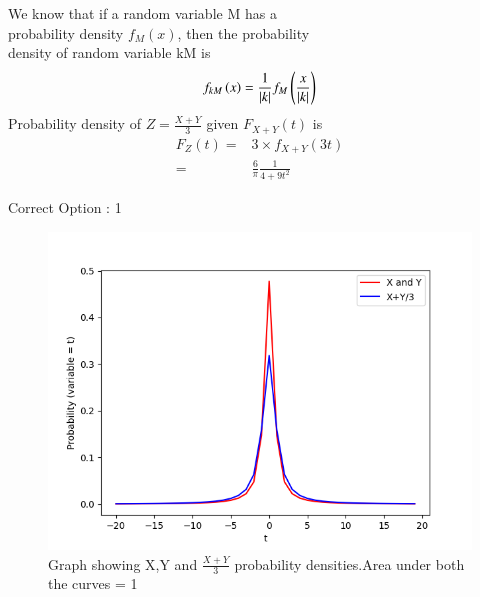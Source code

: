\documentclass[journal,12pt,twocolumn]{IEEEtran}
\begin{document}
We know that if a random variable M has a\\probability density $f_M(x)$, then the probability \\density of random variable kM is
\begin{align}
    f_{kM}\left(x\right) = \frac{1}{\vert k\vert} f_M\left(\frac{x}{\vert k\vert}\right)
\end{align}
Probability density of $Z = \displaystyle\frac{X+Y}{3}$ given $F_{X+Y}(t)$ is
\begin{align}
    F_{Z}(t) = & 3\times \displaystyle f_{X+Y}(3t) \\
    =          & \frac{6}{\pi} \frac{1}{4+9{t}^2}
\end{align}
\begin{center}
    Correct Option : 1
\end{center}
\begin{figure}[H]
    \includegraphics[width = \columnwidth]{Assignment-8.png}
    \caption{Graph showing X,Y and $\frac{X+Y}{3}$ probability densities.Area under both the curves = 1}
\end{figure}
\end{document}
